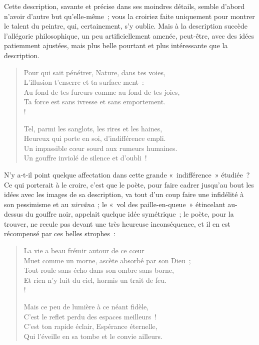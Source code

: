 \documentclass[french,twoside]{book} %
\begin{document}
\noindent Cette description, savante et précise dans ses moindres détails, semble d’abord n’avoir d’autre but qu’elle-même ; vous la croiriez faite uniquement pour montrer le talent du peintre, qui, certainement, s’y oublie. Mais à la description succède l’allégorie philosophique, un peu artificiellement amenée, peut-être, avec des idées patiemment ajustées, mais plus belle pourtant et plus intéressante que la description.\par


\begin{verse}
Pour qui sait pénétrer, Nature, dans tes voies,\\
L’illusion t’enserre et ta surface ment :\\
Au fond de tes fureurs comme au fond de tes joies,\\
Ta force est sans ivresse et sans emportement.\\!

Tel, parmi les sanglots, les rires et les haines,\\
Heureux qui porte en soi, d’indifférence empli.\\
Un impassible cœur sourd aux rumeurs humaines.\\
Un gouffre inviolé de silence et d’oubli !\\
\end{verse}

\noindent N’y a-t-il point quelque affectation dans cette grande « indifférence » étudiée ? Ce qui porterait à le croire, c’est que le poète, pour faire cadrer jusqu’au bout les idées avec les images de sa description, va tout d’un coup faire une infidélité à son pessimisme et au \emph{nirvâna} ; le « vol des paille-en-queue » étincelant au-dessus du gouffre noir, appelait quelque idée symétrique ; le poète, pour la trouver, ne recule pas devant une très heureuse inconséquence, et il en est récompensé par ces belles strophes :\par


\begin{verse}
La vie a beau frémir autour de ce cœur\\
Muet comme un morne, ascète absorbé par son Dieu ;\\
Tout roule sans écho dans son ombre sans borne,\\
Et rien n’y luit du ciel, hormis un trait de feu.\\!

Mais ce peu de lumière à ce néant fidèle,\\
C’est le reflet perdu des espaces meilleurs !\\
C’est ton rapide éclair, Espérance éternelle,\\
Qui l’éveille en sa tombe et le convie ailleurs.\\
\end{verse}
\end{document}
